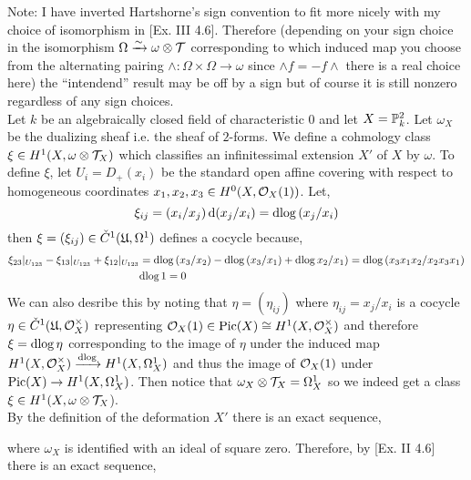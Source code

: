 \documentclass[12pt]{article}
\begin{document}
Note: I have inverted Hartshorne's sign convention to fit more nicely with my choice of isomorphism in [Ex. III 4.6]. Therefore (depending on your sign choice in the isomorphism $\Omega \iso \omega \ot \T$ corresponding to which induced map you choose from the alternating pairing $\wedge : \Omega \times \Omega \to \omega$ since $\wedge f = -f \wedge$ there is a real choice here) the ``intendend'' result may be off by a sign but of course it is still nonzero regardless of any sign choices.
\bigskip\\
Let $k$ be an algebraically closed field of characteristic $0$ and let $X = \P^2_k$. Let $\omega_X$ be the dualizing sheaf i.e. the sheaf of $2$-forms. We define a cohmology class $\xi \in H^1(X, \omega \ot \T_X)$ which classifies an infinitessimal extension $X'$ of $X$ by $\omega$. To define $\xi$, let $U_i = D_+(x_i)$ be the standard open affine covering with respect to homogeneous coordinates $x_1, x_2, x_3 \in H^0(X, \struct{X}(1))$. Let,
\[ \xi_{ij} = (x_i/x_j) \, \d{(x_j / x_i)} = \d{\log{(x_j/x_i)}} \]
then $\xi = (\xi_{ij}) \in \check{C}^1(\U, \Omega^1)$ defines a cocycle because,
\begin{align*}
\xi_{23}|_{U_{123}} - \xi_{13}|_{U_{123}} + \xi_{12} |_{U_{123}} & = \d{\log{(x_3/x_2)}} - \d{\log{(x_3/x_1)}} + \d{\log{x_2/x_1)}} = \d{\log{(x_3 x_1 x_2 / x_2 x_3 x_1)}} 
\\
& \d{\log{1}} = 0
\end{align*}
We can also desribe this by noting that $\eta = (\eta_{ij})$ where $\eta_{ij} = x_j / x_i$ is a cocycle $\eta \in \check{C}^1(\U, \struct{X}^\times)$ representing $\struct{X}(1) \in \Pic{X} \cong H^1(X, \struct{X}^\times)$ and therefore $\xi = \d{\log{\eta}}$ corresponding to the image of $\eta$ under the induced map $H^1(X, \struct{X}^\times) \tolabel{\d{\log}} H^1(X, \Omega^1_X)$ and thus the image of $\struct{X}(1)$ under $\Pic{X} \to H^1(X, \Omega^1_X)$.
Then notice that $\omega_X \ot \T_X = \Omega^1_X$ so we indeed get a class $\xi \in H^1(X, \omega \ot \T_X$).
\bigskip\\
By the definition of the deformation $X'$ there is an exact sequence,
\begin{center}
\end{center}
where $\omega_X$ is identified with an ideal of square zero. Therefore, by [Ex. II 4.6] there is an exact sequence,
\begin{center}
\end{center}
\end{document}

